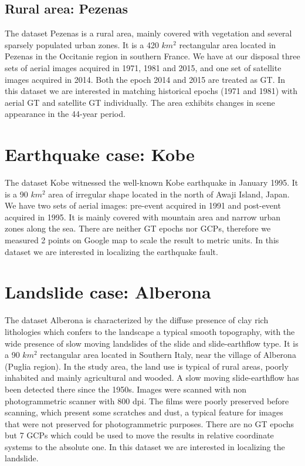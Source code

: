 \subsection{Rural area: Pezenas}
The dataset Pezenas is a rural area, mainly covered with vegetation and several sparsely populated urban zones. It is a 420 $km^2$ rectangular area located in Pezenas in the Occitanie region in southern France. We have at our disposal three sets of aerial images acquired in 1971, 1981 and 2015, and one set of satellite images acquired in 2014. Both the epoch 2014 and 2015 are treated as \ac{GT}. In this dataset we are interested in matching historical epochs (1971 and 1981) with aerial \ac{GT} and satellite \ac{GT} individually. The area exhibits changes in scene appearance in the 44-year period.\\

\section{Earthquake case: Kobe}
The dataset Kobe witnessed the well-known Kobe earthquake in January 1995. It is a 90 $km^2$ area of irregular shape located in the north of Awaji Island, Japan. We have two sets of aerial images: pre-event acquired in 1991 and post-event acquired in 1995. It is mainly covered with mountain area and narrow urban zones along the sea. There are neither \ac{GT} epochs nor \ac{GCP}s, therefore we measured 2 points on Google map to scale the result to metric units. In this dataset we are interested in localizing the earthquake fault.

\section{Landslide case: Alberona}
The dataset Alberona is characterized by the diffuse presence of clay rich lithologies which confers to the landscape a typical smooth topography, with the wide presence of slow moving landslides of the slide and slide-earthflow type. It is a 90 $km^2$ rectangular area located in Southern Italy, near the village of Alberona (Puglia region). 
In the study area, the land use is typical of rural areas, poorly inhabited and mainly agricultural and wooded. A slow moving slide-earthflow has been detected there since the 1950s. 
Images were scanned with non photogrammetric scanner with 800 dpi. The films were poorly preserved before scanning, which present some scratches and dust, a typical feature for images that were not preserved for photogrammetric purposes.
There are no \ac{GT} epochs but 7 \ac{GCP}s which could be used to move the results in relative coordinate systems to the absolute one.
In this dataset we are interested in localizing the landslide.

